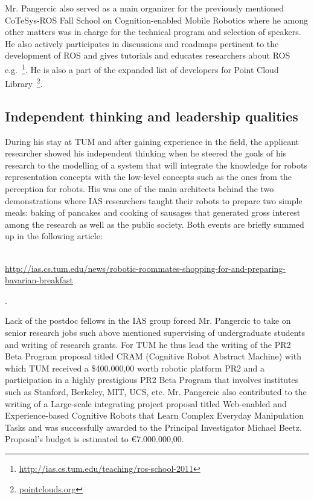 Mr. Pangercic also served as a main organizer for the previously mentioned CoTeSys-ROS Fall School on 
Cognition-enabled Mobile Robotics where he among other matters was in charge for the technical
program and selection of speakers. He also actively participates in discussions and roadmaps
pertinent to the development of ROS and gives tutorials and educates researchers about
ROS e.g.~\footnote{\url{http://ias.cs.tum.edu/teaching/ros-school-2011}}. He is also a part of
the expanded list of developers for Point Cloud Library~\footnote{\url{pointclouds.org}}.
 
\subsection{Independent thinking and leadership qualities} 
During his stay at TUM and after gaining experience in the field, the applicant researcher 
showed his independent thinking when he steered the goals of his research to the
modelling of a system that will integrate the knowledge for robots representation concepts
with the low-level concepts such as the ones from the perception for robots.
His was one of the main architects behind the two demonstrations where IAS researchers
taught their robots to prepare two simple meals: baking of pancakes and cooking of 
sausages that generated gross interest among the research as well as the public
society. Both events are briefly summed up in the following 
article:\\~\begin{small}\url{http://ias.cs.tum.edu/news/robotic-roommates-shopping-for-and-preparing-bavarian-breakfast}\end{small}.

Lack of the postdoc fellows in the IAS group forced Mr. Pangercic to take on senior research
jobs such above mentioned supervising of undergraduate students and writing of research grants.
For TUM he thus lead the writing of the PR2 Beta Program proposal titled CRAM (Cognitive Robot Abstract Machine)
with which TUM received a \$400.000,00 worth robotic platform PR2 and a participation in a highly 
prestigious PR2 Beta Program that involves institutes such as Stanford, Berkeley, MIT, UCS, etc.
Mr. Pangercic also contributed to the writing of a Large-scale integrating project proposal titled Web-enabled and Experience-based 
Cognitive Robots that Learn Complex Everyday Manipulation Tasks and was successfully awarded to 
the Principal Investigator Michael Beetz. Proposal's budget is estimated to \euro7.000.000,00.

